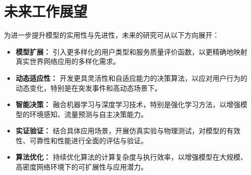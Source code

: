 \documentclass{article}
\begin{document}
\section{未来工作展望}
为进一步提升模型的实用性与先进性，未来的研究可从以下方向展开：
\begin{itemize}
    \item \textbf{模型扩展：} 引入更多样化的用户类型和服务质量评价函数，以更精确地映射真实世界网络应用的多样化需求。
    \item \textbf{动态适应性：} 开发更具灵活性和自适应能力的决策算法，以应对用户行为的动态变化，特别是在突发事件和高动态场景下。
    \item \textbf{智能决策：} 融合机器学习与深度学习技术，特别是强化学习方法，以增强模型的环境感知、流量预测与自主决策能力。
    \item \textbf{实证验证：} 结合具体应用场景，开展仿真实验与物理测试，对模型的有效性、可靠性和性能进行全面的评估与验证。
    \item \textbf{算法优化：} 持续优化算法的计算复杂度与执行效率，以增强模型在大规模、高密度网络环境下的可扩展性与应用潜力。
\end{itemize}
\end{document}
